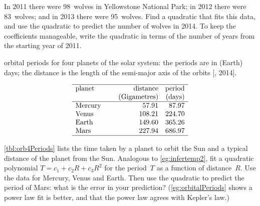 \begin{exercise} \label{ex:} 
In 2011 there were 98~wolves in Yellowstone National Park; in 2012 there were 83~wolves; and in 2013 there were 95~wolves.
Find a quadratic that fits this data, and use the quadratic to predict the number of wolves in 2014.
To keep the coefficients manageable, write the quadratic in terms of the number of years from the starting year of 2011.
\end{exercise}








\begin{exercise} \label{ex:orb4Periods} 
\begin{table}
\caption{orbital periods for four planets of the solar system: the periods are in (Earth) days; the distance is the length of the semi-major axis of the orbits [, 2014].}
\label{tbl:orb4Periods}
\begin{equation*}
\begin{array}{p{12ex}rr} \hline
planet&\text{distance}&\text{period}\\
&\text{(Gigametres)}&\text{(days)}\\\hline
Mercury& 57.91 & 87.97 \\
Venus& 108.21 & 224.70 \\
Earth& 149.60& 365.26\\
Mars& 227.94& 686.97\\\hline
\end{array}
\end{equation*}
\end{table}%
\autoref{tbl:orb4Periods} lists the time taken by a planet to orbit the Sun and a typical distance of the planet from the Sun. 
Analogous to \autoref{eg:infertemp2}, fit a quadratic polynomial \(T=c_1+c_2R+c_3R^2\) for the period~\(T\) as a function of distance~\(R\).
Use the data for Mercury, Venus and Earth.
Then use the quadratic to predict the period of Mars: what is the error in your prediction?
(\autoref{eg:orbitalPeriods} shows a power law fit is better, and that the power law agrees with Kepler's law.)
\end{exercise}







